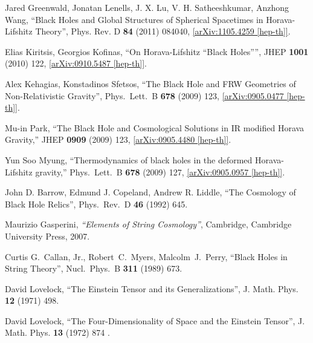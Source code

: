 \documentclass[12pt]{article}
\newcommand{\2}{$^2$}
\newcommand{\3}{$^3$}
\newcommand{\4}{$_4$}
\newcommand{\5}{$_5$}
\begin{document}
\begin{thebibliography}{400}
Jared Greenwald, Jonatan Lenells, J. X. Lu, V. H. Satheeshkumar, Anzhong Wang, ``Black Holes and Global Structures of Spherical Spacetimes in Horava-Lifshitz Theory'', Phys. Rev. D \textbf{84} (2011) 084040, \href{http://arxiv.org/abs/1105.4259}{[arXiv:1105.4259 [hep-th]]}.

Elias Kiritsis, Georgios Kofinas, ``On Horava-Lifshitz ``Black Holes'''', JHEP \textbf{1001} (2010) 122, \href{http://arxiv.org/abs/0910.5487}{[arXiv:0910.5487 [hep-th]]}.
  
Alex Kehagias, Konstadinos Sfetsos,
  ``The Black Hole and FRW Geometries of Non-Relativistic Gravity'',
  Phys.\ Lett.\ B {\bf 678} (2009) 123, 
  \href{http://arxiv.org/abs/0905.0477}{[arXiv:0905.0477 [hep-th]]}.

Mu-in Park,
  ``The Black Hole and Cosmological Solutions in IR modified Horava Gravity,''
  JHEP {\bf 0909} (2009) 123,
  \href{http://arxiv.org/abs/0905.4480}{[arXiv:0905.4480 [hep-th]]}.

Yun Soo Myung,
  ``Thermodynamics of black holes in the deformed Horava-Lifshitz gravity,''
  Phys.\ Lett.\ B {\bf 678} (2009) 127,
  \href{http://arxiv.org/abs/0905.0957}{[arXiv:0905.0957 [hep-th]]}.


John D. Barrow, Edmund J. Copeland, Andrew R. Liddle,
  ``The Cosmology of Black Hole Relics'',
  Phys.\ Rev.\ D {\bf 46} (1992) 645.

  Maurizio Gasperini, {\it ``Elements of String Cosmology''}, Cambridge, Cambridge University Press, 2007.

  Curtis G.~Callan, Jr., Robert~C.~Myers, Malcolm~J.~Perry,
  ``Black Holes in String Theory'',
  Nucl.\ Phys.\ B {\bf 311} (1989) 673.

David Lovelock, ``The Einstein Tensor and its Generalizations'', J. Math. Phys. {\bf 12} (1971) 498.

David Lovelock, ``The Four-Dimensionality of Space and the Einstein Tensor'', J. Math. Phys. {\bf 13} (1972) 874 .


\end{thebibliography}
\end{document}
